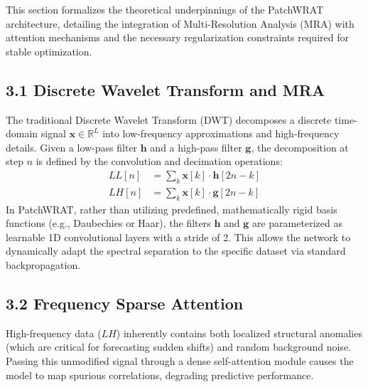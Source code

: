 \documentclass[11pt, letterpaper]{article}
\begin{document}
This section formalizes the theoretical underpinnings of the PatchWRAT architecture, detailing the integration of Multi-Resolution Analysis (MRA) with attention mechanisms and the necessary regularization constraints required for stable optimization.

\subsection{3.1 Discrete Wavelet Transform and MRA}
The traditional Discrete Wavelet Transform (DWT) decomposes a discrete time-domain signal $\mathbf{x} \in \mathbb{R}^L$ into low-frequency approximations and high-frequency details. Given a low-pass filter $\mathbf{h}$ and a high-pass filter $\mathbf{g}$, the decomposition at step $n$ is defined by the convolution and decimation operations:
\begin{align}
    LL[n] &= \sum_{k} \mathbf{x}[k] \cdot \mathbf{h}[2n - k] \\
    LH[n] &= \sum_{k} \mathbf{x}[k] \cdot \mathbf{g}[2n - k]
\end{align}
In PatchWRAT, rather than utilizing predefined, mathematically rigid basis functions (e.g., Daubechies or Haar), the filters $\mathbf{h}$ and $\mathbf{g}$ are parameterized as learnable 1D convolutional layers with a stride of 2. This allows the network to dynamically adapt the spectral separation to the specific dataset via standard backpropagation.

\subsection{3.2 Frequency Sparse Attention}
High-frequency data ($LH$) inherently contains both localized structural anomalies (which are critical for forecasting sudden shifts) and random background noise. Passing this unmodified signal through a dense self-attention module causes the model to map spurious correlations, degrading predictive performance. 
\end{document}
